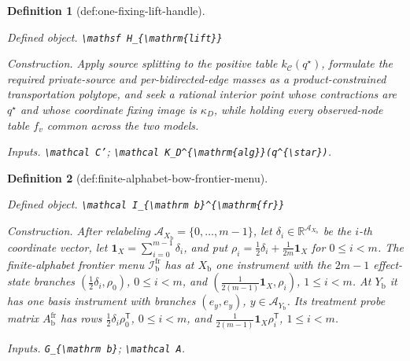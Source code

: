\documentclass{article}
\newtheorem{definition}{Definition}
\begin{document}
\begin{definition}[def:one-fixing-lift-handle]\label{def:one-fixing-lift-handle}
\par\smallskip\noindent\emph{Defined object.} \texttt{\textbackslash{}\allowbreak{}mathsf H\_\allowbreak{}\{\textbackslash{}\allowbreak{}mathrm\{lift\}\allowbreak{}\}\allowbreak{}}
\par\smallskip\noindent\emph{Construction.} Apply source splitting to the positive table \(k_{\mathcal C}(q^{\star})\), formulate the required private-source and per-bidirected-edge masses as a product-constrained transportation polytope, and seek a rational interior point whose contractions are \(q^{\star}\) and whose coordinate fixing image is \(\kappa_D\), while holding every observed-node table \(f_v\) common across the two models.
\par\smallskip\noindent\emph{Inputs.} \texttt{\textbackslash{}\allowbreak{}mathcal C'}; \texttt{\textbackslash{}\allowbreak{}mathcal K\_\allowbreak{}D\textasciicircum{}\{\textbackslash{}\allowbreak{}mathrm\{alg\}\allowbreak{}\}\allowbreak{}(q\textasciicircum{}\{\textbackslash{}\allowbreak{}star\}\allowbreak{})}.
\end{definition}

\begin{definition}[def:finite-alphabet-bow-frontier-menu]\label{def:finite-alphabet-bow-frontier-menu}
\par\smallskip\noindent\emph{Defined object.} \texttt{\textbackslash{}\allowbreak{}mathcal I\_\allowbreak{}\{\textbackslash{}\allowbreak{}mathrm b\}\allowbreak{}\textasciicircum{}\{\textbackslash{}\allowbreak{}mathrm\{fr\}\allowbreak{}\}\allowbreak{}}
\par\smallskip\noindent\emph{Construction.} After relabeling \(\mathcal A_{X_{\mathrm b}}=\{0,\ldots,m-1\}\), let \(\delta_i\in\mathbb R^{\mathcal A_{X_{\mathrm b}}}\) be the \(i\)-th coordinate vector, let \(\mathbf 1_X=\sum_{i=0}^{m-1}\delta_i\), and put \(\rho_i=\tfrac12\delta_i+\tfrac1{2m}\mathbf 1_X\) for \(0\le i<m\).  The finite-alphabet frontier menu \(\mathcal I_{\mathrm b}^{\mathrm{fr}}\) has at \(X_{\mathrm b}\) one instrument with the \(2m-1\) effect-state branches \((\tfrac12\delta_i,\rho_0)\), \(0\le i<m\), and \((\tfrac1{2(m-1)}\mathbf 1_X,\rho_i)\), \(1\le i<m\).  At \(Y_{\mathrm b}\) it has one basis instrument with branches \((e_y,e_y)\), \(y\in\mathcal A_{Y_{\mathrm b}}\).  Its treatment probe matrix \(A_{\mathrm b}^{\mathrm{fr}}\) has rows \(\tfrac12\delta_i\rho_0^{\mathsf T}\), \(0\le i<m\), and \(\tfrac1{2(m-1)}\mathbf 1_X\rho_i^{\mathsf T}\), \(1\le i<m\).
\par\smallskip\noindent\emph{Inputs.} \texttt{G\_\allowbreak{}\{\textbackslash{}\allowbreak{}mathrm b\}\allowbreak{}}; \texttt{\textbackslash{}\allowbreak{}mathcal A}.
\end{definition}
\end{document}
